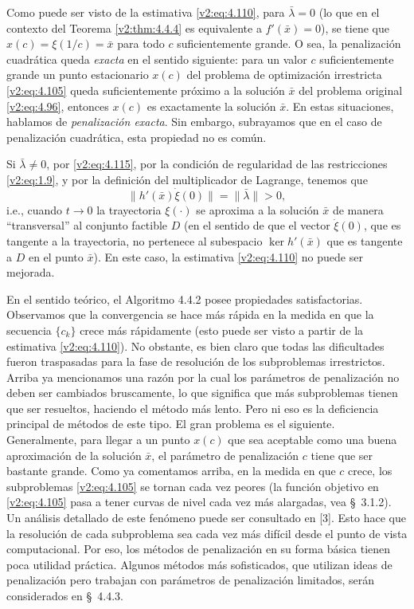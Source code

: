 Como puede ser visto de la estimativa \eqref{v2:eq:4.110}, para $\bar{\lambda} = 0$ (lo que en el contexto del Teorema \ref{v2:thm:4.4.4} es equivalente a $f'(\bar{x}) = 0$), se tiene que $x(c) = \xi(1/c) = \bar{x}$ para todo $c$ suficientemente grande. O sea, la penalización cuadrática queda \textit{exacta} en el sentido siguiente: para un valor $c$ suficientemente grande un punto estacionario $x(c)$ del problema de optimización irrestricta \eqref{v2:eq:4.105} queda suficientemente próximo a la solución $\bar{x}$ del problema original \eqref{v2:eq:4.96}, entonces $x(c)$ es exactamente la solución $\bar{x}$. En estas situaciones, hablamos de \textit{penalización exacta}. Sin embargo, subrayamos que en el caso de penalización cuadrática, esta propiedad no es común.

Si $\bar{\lambda} \neq 0$, por \eqref{v2:eq:4.115}, por la condición de regularidad de las restricciones \eqref{v2:eq:1.9}, y por la definición del multiplicador de Lagrange, tenemos que
\[
    \|h'(\bar{x})\dot{\xi}(0)\| = \|\bar{\lambda}\| > 0,
\]
i.e., cuando $t \to 0$ la trayectoria $\xi(\cdot)$ se aproxima a la solución $\bar{x}$ de manera ``transversal'' al conjunto factible $D$ (en el sentido de que el vector $\dot{\xi}(0)$, que es tangente a la trayectoria, no pertenece al subespacio $\ker h'(\bar{x})$ que es tangente a $D$ en el punto $\bar{x}$). En este caso, la estimativa \eqref{v2:eq:4.110} no puede ser mejorada.

En el sentido teórico, el Algoritmo 4.4.2 posee propiedades satisfactorias. Observamos que la convergencia se hace más rápida en la medida en que la secuencia $\{c_k\}$ crece más rápidamente (esto puede ser visto a partir de la estimativa \eqref{v2:eq:4.110}). No obstante, es bien claro que todas las dificultades fueron traspasadas para la fase de resolución de los subproblemas irrestrictos. Arriba ya mencionamos una razón por la cual los parámetros de penalización no deben ser cambiados bruscamente, lo que significa que más subproblemas tienen que ser resueltos, haciendo el método más lento. Pero ni eso es la deficiencia principal de métodos de este tipo. El gran problema es el siguiente. Generalmente, para llegar a un punto $x(c)$ que sea aceptable como una buena aproximación de la solución $\bar{x}$, el parámetro de penalización $c$ tiene que ser bastante grande. Como ya comentamos arriba, en la medida en que $c$ crece, los subproblemas \eqref{v2:eq:4.105} se tornan cada vez peores (la función objetivo en \eqref{v2:eq:4.105} pasa a tener curvas de nivel cada vez más alargadas, vea \S~3.1.2). Un análisis detallado de este fenómeno puede ser consultado en [3]. Esto hace que la resolución de cada subproblema sea cada vez más difícil desde el punto de vista computacional. Por eso, los métodos de penalización en su forma básica tienen poca utilidad práctica. Algunos métodos más sofisticados, que utilizan ideas de penalización pero trabajan con parámetros de penalización limitados, serán considerados en \S~4.4.3.

